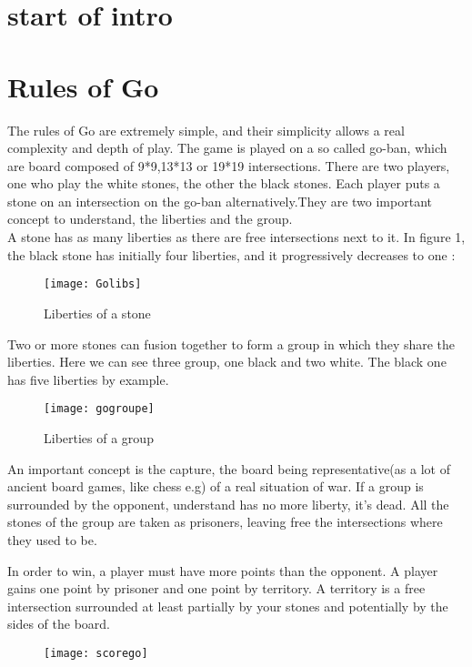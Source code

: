 \section{start of intro}

\section{Rules of Go}

The rules of Go are extremely simple, and their simplicity allows a real complexity and depth of play. The game is played on a so called go-ban, which are board composed of 9*9,13*13 or 19*19 intersections. There are two players, one who play the white stones, the other the black stones. Each player puts a stone on an intersection on the go-ban alternatively.They are two important concept to understand, the liberties and the group. 
\\

A stone has as many liberties as there are free intersections next to it. In figure 1, the black stone has initially four liberties, and it progressively decreases to one : 

\begin{figure}

\begin{center}
\texttt{[image: Golibs]}
\caption{Liberties of a stone}
\end{center}

\end{figure}
Two or more stones can fusion together to form a group in which they share the liberties. Here we can see three group, one black and two white. The black one has five liberties by example. 

\begin{figure}
\begin{center}
\texttt{[image: gogroupe]}
\end{center}
\caption{Liberties of a group}
\end{figure}
An important concept is the capture, the board being representative(as a lot of ancient board games, like chess e.g) of a real situation of war. If a group is surrounded by the opponent, understand has no more liberty, it's dead. All the stones of the group are taken as prisoners, leaving free the intersections where they used to be. 

In order to win, a player must have more points than the opponent. A player gains one point by prisoner and one point by territory. A territory is a free intersection surrounded at least partially by your stones and potentially by the sides of the board. 
\begin{figure}
\begin{center}
\texttt{[image: scorego]}
\end{center}
\caption{}
\end{figure}